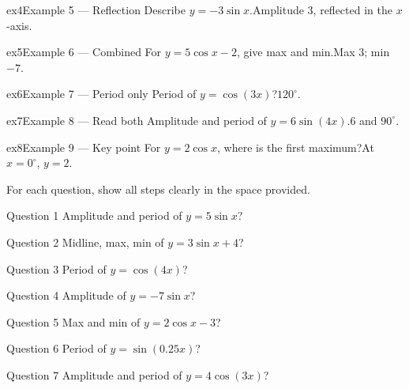 \documentclass[11pt]{article}
\begin{document}
\begin{example}{ex4}{Example 5 --- Reflection}
Describe $y=-3\sin x$.\soln Amplitude $3$, reflected in the $x$-axis.
\end{example}

\begin{example}{ex5}{Example 6 --- Combined}
For $y=5\cos x-2$, give max and min.\soln Max $3$; min $-7$.
\end{example}

\begin{example}{ex6}{Example 7 --- Period only}
Period of $y=\cos(3x)$?\soln $120^\circ$.
\end{example}

\begin{example}{ex7}{Example 8 --- Read both}
Amplitude and period of $y=6\sin(4x)$.\soln $6$ and $90^\circ$.
\end{example}

\begin{example}{ex8}{Example 9 --- Key point}
For $y=2\cos x$, where is the first maximum?\soln At $x=0^\circ$, $y=2$.
\end{example}

\clearpage
{}
For each question, show all steps clearly in the space provided.

\begin{qbox}{Question 1}
Amplitude and period of $y=5\sin x$?\workspace{2.4cm}
\end{qbox}

\begin{qbox}{Question 2}
Midline, max, min of $y=3\sin x+4$?\workspace{2.4cm}
\end{qbox}

\begin{qbox}{Question 3}
Period of $y=\cos(4x)$?\workspace{2.4cm}
\end{qbox}

\begin{qbox}{Question 4}
Amplitude of $y=-7\sin x$?\workspace{2.4cm}
\end{qbox}

\begin{qbox}{Question 5}
Max and min of $y=2\cos x-3$?\workspace{2.4cm}
\end{qbox}

\begin{qbox}{Question 6}
Period of $y=\sin(0.25x)$?\workspace{2.4cm}
\end{qbox}

\begin{qbox}{Question 7}
Amplitude and period of $y=4\cos(3x)$?\workspace{2.4cm}
\end{qbox}
\end{document}
